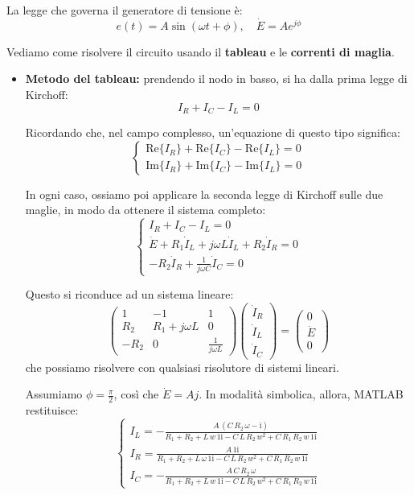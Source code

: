 \documentclass[a4paper,11pt]{article}
\begin{document}
La legge che governa il generatore di tensione è:
$$
e(t) = A\sin\left(\omega t + \phi \right), \quad \dot{E} = A e^{j \phi}
$$

Vediamo come risolvere il circuito usando il \textbf{tableau} e le \textbf{correnti di maglia}.

\begin{itemize}
	\item \textbf{Metodo del tableau:} prendendo il nodo in basso, si ha dalla prima legge di Kirchoff:
$$
I_R + I_C - I_L = 0
$$

Ricordando che, nel campo complesso, un'equazione di questo tipo significa:
\[
	\begin{cases}			
		\mathrm{Re}\{I_R\} + \mathrm{Re}\{I_C\} - \mathrm{Re}\{I_L\} = 0 \\ 
		\mathrm{Im}\{I_R\} + \mathrm{Im}\{I_C\} - \mathrm{Im}\{I_L\} = 0  
	\end{cases}
\]

In ogni caso, ossiamo poi applicare la seconda legge di Kirchoff sulle due maglie, in modo da ottenere il sistema completo:
\[
	\begin{cases}
		I_R + I_C - I_L = 0 \\
		\dot{E} + R_1 \dot{I}_L + j \omega L \dot{I}_L + R_2 \dot{I}_R = 0 \\ 
		-R_2 \dot{I}_R + \frac{1}{j\omega C} \dot{I}_C = 0
	\end{cases}
\]

	Questo si riconduce ad un sistema lineare:
$$
\begin{pmatrix}
	1 & -1 & 1 \\ R_2 & R_1 + j\omega L & 0 \\ -R_2 & 0 & \frac{1}{j\omega L}
\end{pmatrix}
\begin{pmatrix}
	\dot{I}_R \\ \dot{I}_L \\ \dot{I}_C
\end{pmatrix} = 
\begin{pmatrix}
	0 \\ \dot{E} \\ 0
\end{pmatrix}
$$
che possiamo risolvere con qualsiasi risolutore di sistemi lineari.

Assumiamo $\phi = \frac{\pi}{2}$, così che $\dot{E} = Aj$.
In modalità simbolica, allora, MATLAB restituisce:
$$
\begin{cases}
     I_{L} = -\frac{A\,\left(C\,R_{2}\,\omega -\mathrm{i}\right)}{R_{1}+R_{2}+L\,w\,1{}\mathrm{i}-C\,L\,R_{2}\,w^2+C\,R_{1}\,R_{2}\,w\,1{}\mathrm{i}} \\ 
     I_{R} = \frac{A\,1{}\mathrm{i}}{R_{1}+R_{2}+L\,\omega \,1{}\mathrm{i}-C\,L\,R_{2}\,w^2+C\,R_{1}\,R_{2}\,w\,1{}\mathrm{i}} \\
     I_{C} = -\frac{A\,C\,R_{2}\,\omega }{R_{1}+R_{2}+L\,w\,1{}\mathrm{i}-C\,L\,R_{2}\,w^2+C\,R_{1}\,R_{2}\,w\,1{}\mathrm{i}}
\end{cases}
$$


\end{itemize}
\end{document}
